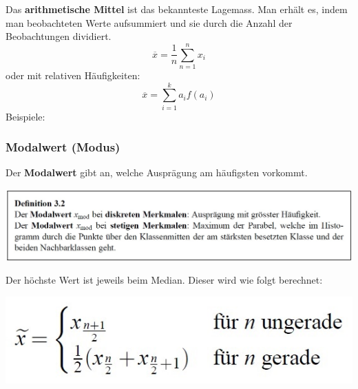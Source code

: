\documentclass[12pt,a4paper]{article} %
\begin{document}
Das \textbf{arithmetische Mittel} ist das bekannteste Lagemass. Man erhält es, indem man beobachteten Werte aufsummiert und sie durch die Anzahl der Beobachtungen dividiert.
$$\overline{x} = \frac{1}{n} \sum_{n=1}^n x_i$$
oder mit relativen Häufigkeiten:
$$\overline{x} = \sum_{i=1}^k a_if(a_i)$$
Beispiele:
\begin{center}
\end{center}

\subsubsection{Modalwert (Modus)}
Der \textbf{Modalwert} gibt an, welche Ausprägung am häufigsten vorkommt.

\begin{center}
\includegraphics[scale=0.5]{defModalwert.jpg}
\end{center}

Der höchste Wert ist jeweils beim Median. Dieser wird wie folgt berechnet:
\begin{center}
\includegraphics[scale=0.5]{medianBerech.jpg}
\end{center}
\end{document}
